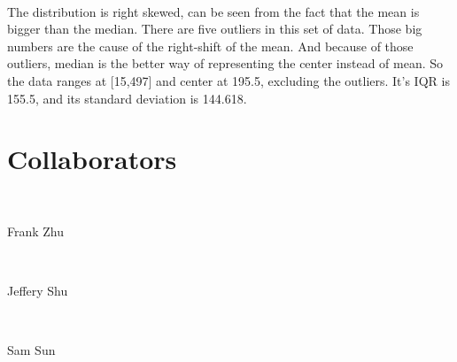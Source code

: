 \documentclass{article}
\begin{document}
~

The distribution is right skewed, can be seen from the fact that the mean is bigger than the median. There are five outliers in this set of data. Those big numbers are the cause of the right-shift of the mean. And because of those outliers, median is the better way of representing the center instead of mean. So the data ranges at [15,497] and center at 195.5, excluding the outliers. It's IQR is 155.5, and its standard deviation is 144.618.

\newpage

\section*{Collaborators}

~

Frank Zhu

~

Jeffery Shu

~

Sam Sun
\end{document}
